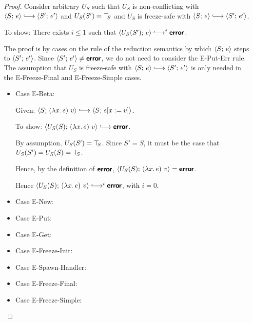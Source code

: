 \begin{proof}
  Consider arbitrary $U_S$ such that $U_S$ is non-conflicting with
  $\config{S}{e} \parstepsto \config{S'}{e'}$ and $U_S(S') = \top\hspace{-0.85mm}_{S}$
  and $U_S$ is freeze-safe with $\config{S}{e} \parstepsto
  \config{S'}{e'}$.

  To show: There exists $i \leq 1$ such that $\config{U_S(S')}{e}
  \parstepsto^i \error$.

  The proof is by cases on the rule of the reduction semantics by
  which $\langle S;\, e \rangle$ steps to $\langle S';\, e' \rangle$.  Since
  $\langle S';\, e' \rangle \neq \textbf{\textsf{error}}$, we do not need to consider the {\sc
    E-Put-Err} rule.  The assumption that $U_S$ is freeze-safe with
  $\config{S}{e} \parstepsto \config{S'}{e'}$ is only needed in the
  {\sc E-Freeze-Final} and {\sc E-Freeze-Simple} cases.

  \begin{itemize}

  \item Case {\sc E-Beta}:

    Given: $\config{S}{\app{(\lam{x}{e})}{v}} \parstepsto
    \config{S}{\subst{e}{x}{v}}$.

    To show: $\config{U_S(S)}{\app{(\lam{x}{e})}{v}} \parstepsto
    \error$.

    By assumption, $U_S(S') = \top\hspace{-0.85mm}_{S}$.  Since $S' = S$, it must be the
    case that $U_S(S') = U_S(S) = \top\hspace{-0.85mm}_{S}$.

    Hence, by the definition of $\textbf{\textsf{error}}$,
    $\langle U_S(S);\, (\lambda x.\,e)~v \rangle = \textbf{\textsf{error}}$.

    Hence $\config{U_S(S)}{\app{(\lam{x}{e})}{v}} \parstepsto^i
    \error$, with $i = 0$.

  \item Case {\sc E-New}:


  \item Case {\sc E-Put}:


  \item Case {\sc E-Get}:


  \item Case {\sc E-Freeze-Init}:


  \item Case {\sc E-Spawn-Handler}:


  \item Case {\sc E-Freeze-Final}:


  \item Case {\sc E-Freeze-Simple}:


  \end{itemize}
\end{proof}
